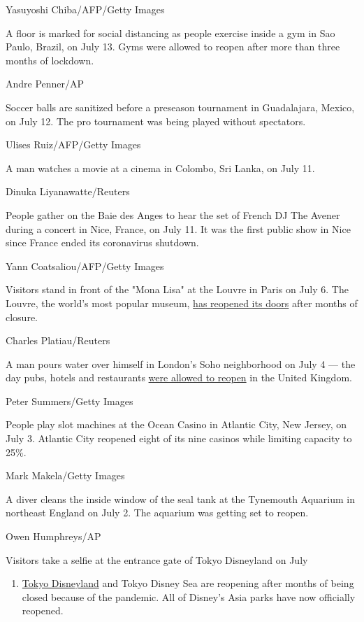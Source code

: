 Yasuyoshi Chiba/AFP/Getty Images

A floor is marked for social distancing as people exercise inside a gym
in Sao Paulo, Brazil, on July 13. Gyms were allowed to reopen after more
than three months of lockdown.

Andre Penner/AP

Soccer balls are sanitized before a preseason tournament in Guadalajara,
Mexico, on July 12. The pro tournament was being played without
spectators.

Ulises Ruiz/AFP/Getty Images

A man watches a movie at a cinema in Colombo, Sri Lanka, on July 11.

Dinuka Liyanawatte/Reuters

People gather on the Baie des Anges to hear the set of French DJ The
Avener during a concert in Nice, France, on July 11. It was the first
public show in Nice since France ended its coronavirus shutdown.

Yann Coatsaliou/AFP/Getty Images

Visitors stand in front of the "Mona Lisa" at the Louvre in Paris on
July 6. The Louvre, the world's most popular museum,
\href{https://www.cnn.com/travel/article/louvre-reopens-july/index.html}{has
reopened its doors} after months of closure.

Charles Platiau/Reuters

A man pours water over himself in London's Soho neighborhood on July 4
--- the day pubs, hotels and restaurants
\href{https://www.cnn.com/2020/07/04/uk/uk-pubs-reopening-saturday-scli-gbr-intl/index.html}{were
allowed to reopen} in the United Kingdom.

Peter Summers/Getty Images

People play slot machines at the Ocean Casino in Atlantic City, New
Jersey, on July 3. Atlantic City reopened eight of its nine casinos
while limiting capacity to 25\%.

Mark Makela/Getty Images

A diver cleans the inside window of the seal tank at the Tynemouth
Aquarium in northeast England on July 2. The aquarium was getting set to
reopen.

Owen Humphreys/AP

Visitors take a selfie at the entrance gate of Tokyo Disneyland on July

\begin{enumerate}
\def\labelenumi{\arabic{enumi}.}
\tightlist
\item
  \href{https://www.cnn.com/travel/article/tokyo-disneyland-reopening-coronavirus-intl-hnk/index.html?search}{Tokyo
  Disneyland} and Tokyo Disney Sea are reopening after months of being
  closed because of the pandemic. All of Disney's Asia parks have now
  officially reopened.
\end{enumerate}

